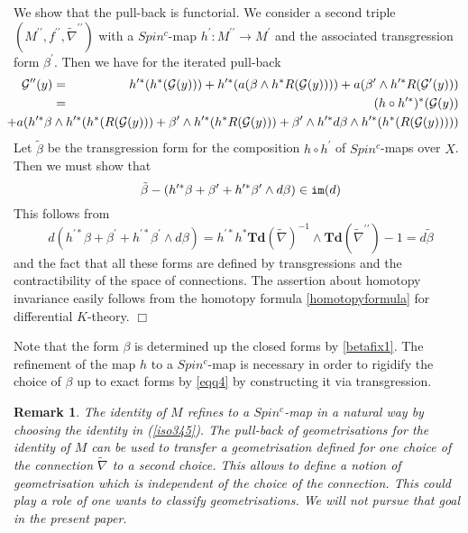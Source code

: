 \documentclass[12pt]{article}
\newtheorem{rem}[theorem]{Remark}
\newcommand{\im}{{\tt im}}
\newcommand{\cG}{{\mathcal{G}}}
\def\hB{\hspace*{\fill}$\Box$ \newline\noindent}
\newcommand{\Td}{{\mathbf{Td}}}
\begin{document}
 
We show that the pull-back is functorial.
We consider a second triple  $(M^{\prime\prime},f^{\prime\prime}, \tilde \nabla^{\prime\prime})$ with a $Spin^{c}$-map
 $h^{\prime}:M^{\prime\prime}\to M^{\prime}$   and the associated transgression form $\beta^{\prime}$.
Then we have for the iterated pull-back
\begin{eqnarray*}\cG^{\prime\prime}(y)&=& h^{\prime *}(h^{*}(\cG(y)))+h^{\prime *} (a(\beta\wedge h^{*}R(\cG(y))))+a(\beta^{\prime}\wedge h^{\prime *} R(\cG^{\prime}(y)))\\
&=&(h\circ h^{\prime *})^{*}(\cG(y))\\&&\hspace{-2cm}+a(h^{\prime *} \beta\wedge h^{\prime *}(h^{*}(R(\cG(y)))+\beta^{\prime}\wedge h^{\prime *}( h^{*}R(\cG(y)))+\beta^{\prime}\wedge h^{\prime *}d\beta\wedge h^{\prime *}(h^{*}(R(\cG(y)))))\\\end{eqnarray*}
Let $\tilde \beta$ be the transgression form for the composition $h\circ h^{\prime}$ of $Spin^{c}$-maps over $X$. Then we must show that
$$\tilde \beta-(h^{\prime *}\beta +\beta^{\prime}+h^{\prime *}\beta^{\prime}\wedge d\beta)\in \im(d)$$
This follows from $$d(h^{\prime *}\beta +\beta^{\prime}+h^{\prime *}\beta^{\prime}\wedge d\beta)=h^{\prime* }h^{*}\Td(\tilde \nabla)^{-1}\wedge\Td(\tilde \nabla^{\prime\prime})-1=d\tilde \beta$$
and the fact that all these forms are defined by transgressions and the contractibility of the space of connections.
The assertion about homotopy invariance easily follows from the homotopy formula \eqref{homotopyformula} for differential $K$-theory.
\hB

Note that the form $\beta$  is determined up the closed forms by \eqref{betafix1}.
The refinement of the map $h$ to a $Spin^{c}$-map is necessary in order to rigidify the choice of $\beta$
up to exact forms by \eqref{eqq4} by constructing it via transgression.   
 

\begin{rem}{\rm
The identity of $M$ refines to a $Spin^{c}$-map   in a natural way by choosing the identity in (\ref{iso345}).
The pull-back of geometrisations for the identity of $M$ can be used to transfer a geometrisation defined for one choice of the connection $\tilde \nabla$ to a second choice.  This allows to define a notion of geometrisation which is independent of the choice of the connection. This could play a role of one wants to classify geometrisations. We will not pursue that goal in the present paper.}
\end{rem}
\end{document}
